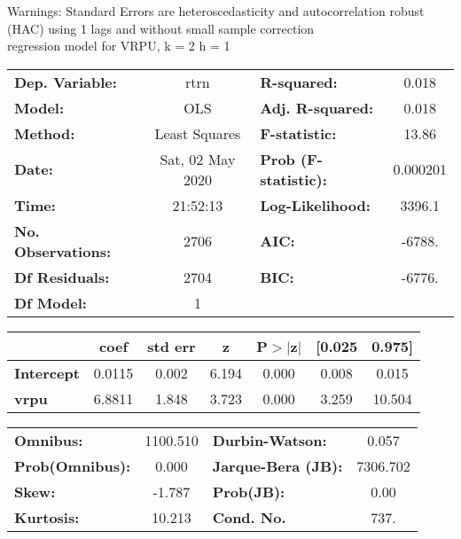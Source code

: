 Warnings: \newline
 [1] Standard Errors are heteroscedasticity and autocorrelation robust (HAC) using 1 lags and without small sample correction\\ 

regression model for VRPU, k = 2 h = 1\begin{center}
\begin{tabular}{lclc}
\toprule
\textbf{Dep. Variable:}    &       rtrn       & \textbf{  R-squared:         } &     0.018   \\
\textbf{Model:}            &       OLS        & \textbf{  Adj. R-squared:    } &     0.018   \\
\textbf{Method:}           &  Least Squares   & \textbf{  F-statistic:       } &     13.86   \\
\textbf{Date:}             & Sat, 02 May 2020 & \textbf{  Prob (F-statistic):} &  0.000201   \\
\textbf{Time:}             &     21:52:13     & \textbf{  Log-Likelihood:    } &    3396.1   \\
\textbf{No. Observations:} &        2706      & \textbf{  AIC:               } &    -6788.   \\
\textbf{Df Residuals:}     &        2704      & \textbf{  BIC:               } &    -6776.   \\
\textbf{Df Model:}         &           1      & \textbf{                     } &             \\
\bottomrule
\end{tabular}
\begin{tabular}{lcccccc}
                   & \textbf{coef} & \textbf{std err} & \textbf{z} & \textbf{P$> |$z$|$} & \textbf{[0.025} & \textbf{0.975]}  \\
\midrule
\textbf{Intercept} &       0.0115  &        0.002     &     6.194  &         0.000        &        0.008    &        0.015     \\
\textbf{vrpu}      &       6.8811  &        1.848     &     3.723  &         0.000        &        3.259    &       10.504     \\
\bottomrule
\end{tabular}
\begin{tabular}{lclc}
\textbf{Omnibus:}       & 1100.510 & \textbf{  Durbin-Watson:     } &    0.057  \\
\textbf{Prob(Omnibus):} &   0.000  & \textbf{  Jarque-Bera (JB):  } & 7306.702  \\
\textbf{Skew:}          &  -1.787  & \textbf{  Prob(JB):          } &     0.00  \\
\textbf{Kurtosis:}      &  10.213  & \textbf{  Cond. No.          } &     737.  \\
\bottomrule
\end{tabular}
\end{center}

